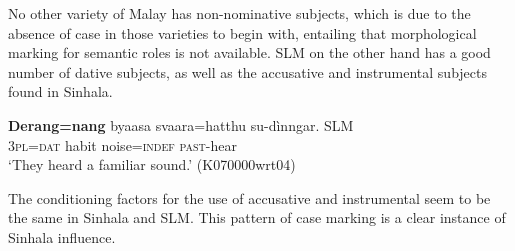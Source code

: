 \documentclass[a4paper,10pt]{article}
\begin{document}


No other variety of Malay has non-nominative subjects, which is due to the absence of case in those varieties to begin with, entailing that morphological marking for semantic roles is not available. SLM on the other hand has a good number of dative subjects, as well as the accusative and instrumental subjects found in Sinhala.


\ea \label{ex:subj:slm:dat}
\gll \textbf{Derang=nang} byaasa svaara=hatthu su-dìnngar. \textsc{SLM}  \\
     \textsc{3pl}=\textsc{dat} habit noise=\textsc{indef} \textsc{past}-hear  \\
    `They heard a familiar sound.'  (K070000wrt04)
\z




The conditioning factors for the use of accusative and instrumental seem to be the same in Sinhala and SLM. This pattern of case marking is a clear instance of Sinhala influence.
\end{document}
